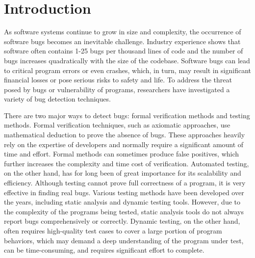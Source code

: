 \chapter{\label{cha:intro}Introduction}


As software systems continue to grow in size and complexity, the occurrence of software bugs becomes an inevitable challenge. Industry experience shows that software often contains 1-25 bugs per thousand lines of code\cite{code-complete} and the number of bugs increases quadratically with the size of the codebase\cite{month}. Software bugs can lead to critical program errors or even crashes, which, in turn, may result in significant financial losses\cite{bug4, bug5} or pose serious risks to safety and life\cite{bug1, bug2, bug3}. To address the threat posed by bugs or vulnerability of programs, researchers have investigated a variety of bug detection techniques. 

There are two major ways to detect bugs: formal verification methods and testing methods. Formal verification techniques, such as axiomatic approaches, use mathematical deduction to prove the absence of bugs. These approaches heavily rely on the expertise of developers and normally require a significant amount of time and effort\cite{sel4}. Formal methods can sometimes produce false positives, which further increases the complexity and time cost of verification.
Automated testing, on the other hand, has for long been of great importance for its scalability and efficiency. Although testing cannot prove full correctness of a program, it is very effective in finding real bugs. Various testing methods have been developed over the years, including static analysis\cite{infer, RacerD} and dynamic testing tools\cite{ASAN, TSAN}. However, due to the complexity of the programs being tested, static analysis tools do not always report bugs comprehensively or correctly. Dynamic testing, on the other hand, often requires high-quality test cases to cover a large portion of program behaviors, which may demand a deep understanding of the program under test, can be time-consuming, and requires significant effort to complete.


